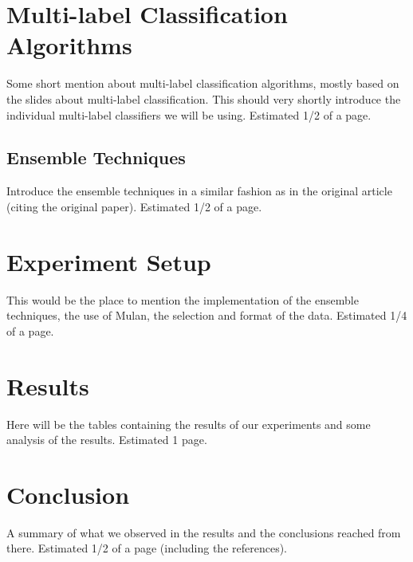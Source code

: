 \documentclass{acm_proc_article-sp}
\begin{document}
\section{Multi-label Classification Algorithms}
Some short mention about multi-label classification algorithms, mostly based on
the slides about multi-label classification. This should very shortly introduce
the individual multi-label classifiers we will be using. Estimated 1/2 of a page.

\subsection*{Ensemble Techniques}
Introduce the ensemble techniques in a similar fashion as in the original
article (citing the original paper). Estimated 1/2 of a page.

\section{Experiment Setup}
This would be the place to mention the implementation of the ensemble
techniques, the use of Mulan, the selection and format of the data. Estimated
1/4 of a page.

\section{Results}
Here will be the tables containing the results of our experiments and some
analysis of the results. Estimated 1 page.




\section{Conclusion}
A summary of what we observed in the results and the conclusions reached from
there. Estimated 1/2 of a page (including the references).



\balancecolumns
\end{document}
